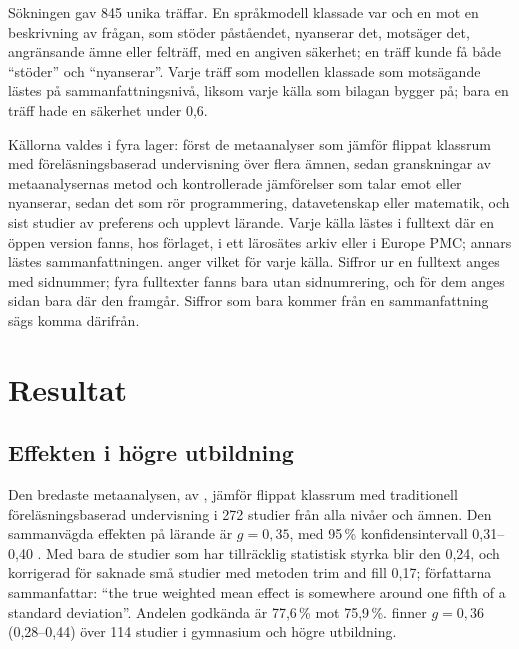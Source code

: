 Sökningen gav 845 unika träffar.  En språkmodell klassade var och en mot en
beskrivning av frågan, som stöder påståendet, nyanserar det, motsäger det,
angränsande ämne eller felträff, med en angiven säkerhet; en träff kunde
få både \enquote{stöder} och \enquote{nyanserar}.  Varje träff som modellen
klassade som motsägande lästes på sammanfattningsnivå, liksom varje källa
som bilagan bygger på; bara en träff hade en säkerhet under 0,6.

Källorna valdes i fyra lager: först de metaanalyser som jämför flippat
klassrum med föreläsningsbaserad undervisning över flera ämnen, sedan
granskningar av metaanalysernas metod och kontrollerade jämförelser som
talar emot eller nyanserar, sedan det som rör programmering, datavetenskap
eller matematik, och sist studier av preferens och upplevt lärande.  Varje
källa lästes i fulltext där en öppen version fanns, hos förlaget, i ett
lärosätes arkiv eller i Europe PMC; annars lästes sammanfattningen.
 anger vilket för varje källa.  Siffror ur
en fulltext anges med sidnummer; fyra fulltexter fanns bara utan
sidnumrering, och för dem anges sidan bara där den framgår.  Siffror som
bara kommer från en sammanfattning sägs komma därifrån.

\section{Resultat}
\label{sec:recap-flippat-resultat}

\subsection{Effekten i högre utbildning}

Den bredaste metaanalysen, av \textcite{LagSaele2019}, jämför flippat
klassrum med traditionell föreläsningsbaserad undervisning i 272 studier
från alla nivåer och ämnen.  Den sammanvägda effekten på lärande är
\(g = 0{,}35\), med 95\,\% konfidensintervall 0,31--0,40
\autocite[1]{LagSaele2019}.  Med bara de studier som har tillräcklig
statistisk styrka blir den 0,24, och korrigerad för saknade små studier
med metoden \foreignlanguage{english}{trim and fill} 0,17; författarna
sammanfattar: \enquote{the true weighted mean effect is somewhere around
one fifth of a standard deviation}\autocite[9]{LagSaele2019}.  Andelen
godkända är 77,6\,\% mot 75,9\,\%\autocite[7]{LagSaele2019}.
\textcite[s.~8 och tabell~3, s.~10]{vanAlten2019} finner \(g = 0{,}36\)
(0,28--0,44) över 114 studier i gymnasium och högre utbildning.

